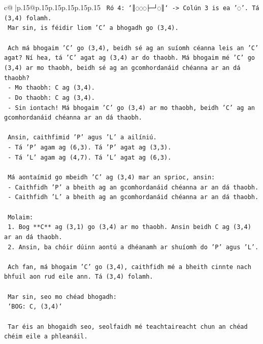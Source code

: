 \documentclass{article}
\begin{document}
{\begin{supertabular}{c@{$\;$}|p{.15\linewidth}@{}p{.15\linewidth}p{.15\linewidth}p{.15\linewidth}p{.15\linewidth}p{.15\linewidth}}
{{{\texttt{     Ró 4: `║◌◌◌├─┘◌║` {-}> Colún 3 is ea '◌'. Tá (3,4) folamh.} \\
\texttt{     Mar sin, is féidir liom 'C' a bhogadh go (3,4).} \\
\\ 
\texttt{   Ach má bhogaim 'C' go (3,4), beidh sé ag an suíomh céanna leis an 'C' agat? Ní hea, tá 'C' agat ag (3,4) ar do thaobh. Má bhogaim mé 'C' go (3,4) ar mo thaobh, beidh sé ag an gcomhordanáid chéanna ar an dá thaobh?} \\
\texttt{   {-} Mo thaobh: C ag (3,4).} \\
\texttt{   {-} Do thaobh: C ag (3,4).} \\
\texttt{   {-} Sin iontach! Má bhogaim 'C' go (3,4) ar mo thaobh, beidh 'C' ag an gcomhordanáid chéanna ar an dá thaobh.} \\
\\ 
\texttt{   Ansin, caithfimid 'P' agus 'L' a ailíniú.} \\
\texttt{   {-} Tá 'P' agam ag (6,3). Tá 'P' agat ag (3,3).} \\
\texttt{   {-} Tá 'L' agam ag (4,7). Tá 'L' agat ag (6,3).} \\
\\ 
\texttt{   Má aontaímid go mbeidh 'C' ag (3,4) mar an sprioc, ansin:} \\
\texttt{   {-} Caithfidh 'P' a bheith ag an gcomhordanáid chéanna ar an dá thaobh.} \\
\texttt{   {-} Caithfidh 'L' a bheith ag an gcomhordanáid chéanna ar an dá thaobh.} \\
\\ 
\texttt{   Molaim:} \\
\texttt{   1. Bog **C** ag (3,1) go (3,4) ar mo thaobh. Ansin beidh C ag (3,4) ar an dá thaobh.} \\
\texttt{   2. Ansin, ba chóir dúinn aontú a dhéanamh ar shuíomh do 'P' agus 'L'.} \\
\\ 
\texttt{   Ach fan, má bhogaim 'C' go (3,4), caithfidh mé a bheith cinnte nach bhfuil aon rud eile ann. Tá (3,4) folamh.} \\
\\ 
\texttt{   Mar sin, seo mo chéad bhogadh:} \\
\texttt{   `BOG: C, (3,4)`} \\
\\ 
\texttt{   Tar éis an bhogaidh seo, seolfaidh mé teachtaireacht chun an chéad chéim eile a phleanáil.} \\
\\ 
}}}
\end{supertabular}}
\end{document}
